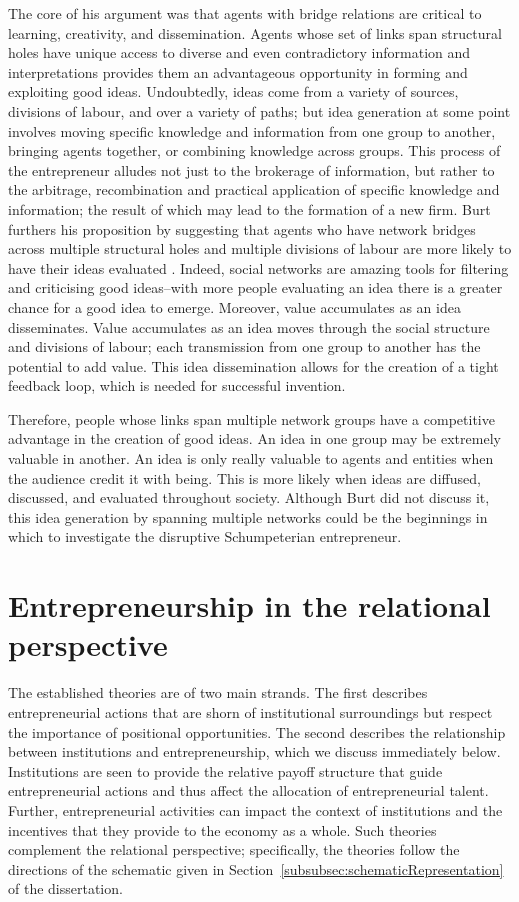 The core of his argument was that agents with bridge relations are critical to learning, creativity, and dissemination. Agents whose set of links span structural holes have unique access to diverse and even contradictory information and interpretations provides them an advantageous opportunity in forming and exploiting good ideas. Undoubtedly, ideas come from a variety of sources, divisions of labour, and over a variety of paths; but idea generation at some point involves moving specific knowledge and information from one group to another, bringing agents together, or combining knowledge across groups. This process of the entrepreneur alludes not just to the brokerage of information, but rather to the arbitrage, recombination and practical application of specific knowledge and information; the result of which may lead to the formation of a new firm. Burt furthers his proposition by suggesting that agents who have network bridges across multiple structural holes and multiple divisions of labour are more likely to have their ideas evaluated \citep{Burt2005}. Indeed, social networks are amazing tools for filtering and criticising good ideas--with more people evaluating an idea there is a greater chance for a good idea to emerge. Moreover, value accumulates as an idea disseminates. Value accumulates as an idea moves through the social structure and divisions of labour; each transmission from one group to another has the potential to add value. This idea dissemination allows for the creation of a tight feedback loop, which is needed for successful invention.

Therefore, people whose links span multiple network groups have a competitive advantage in the creation of good ideas. An idea in one group may be extremely valuable in another. An idea is only really valuable to agents and entities when the audience credit it with being. This is more likely when ideas are diffused, discussed, and evaluated throughout society. Although Burt did not discuss it, this idea generation by spanning multiple networks could be the beginnings in which to investigate the disruptive Schumpeterian entrepreneur.

\section{Entrepreneurship in the relational perspective}

The established theories are of two main strands. The first describes entrepreneurial actions that are shorn of institutional surroundings but respect the importance of positional opportunities. The second describes the relationship between institutions and entrepreneurship, which we discuss immediately below. Institutions are seen to provide the relative payoff structure that guide entrepreneurial actions and thus affect the allocation of entrepreneurial talent. Further, entrepreneurial activities can impact the context of institutions and the incentives that they provide to the economy as a whole. Such theories complement the relational perspective; specifically, the theories follow the directions of the schematic given in Section~\ref{subsubsec:schematicRepresentation} of the dissertation. 

